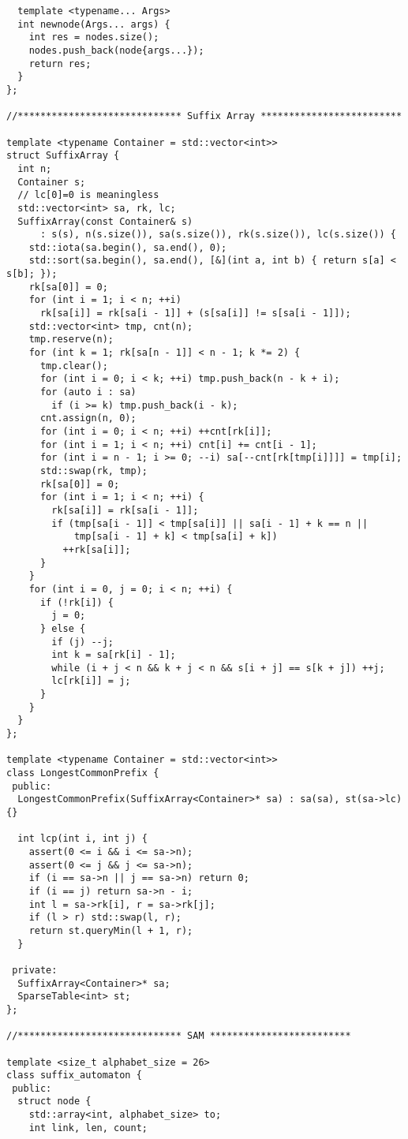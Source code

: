 \documentclass[6pt]{article}
\begin{document}
\begin{multicols}{2}
\begin{lstlisting}
  template <typename... Args>
  int newnode(Args... args) {
    int res = nodes.size();
    nodes.push_back(node{args...});
    return res;
  }
};

//***************************** Suffix Array *************************

template <typename Container = std::vector<int>>
struct SuffixArray {
  int n;
  Container s;
  // lc[0]=0 is meaningless
  std::vector<int> sa, rk, lc;
  SuffixArray(const Container& s)
      : s(s), n(s.size()), sa(s.size()), rk(s.size()), lc(s.size()) {
    std::iota(sa.begin(), sa.end(), 0);
    std::sort(sa.begin(), sa.end(), [&](int a, int b) { return s[a] < s[b]; });
    rk[sa[0]] = 0;
    for (int i = 1; i < n; ++i)
      rk[sa[i]] = rk[sa[i - 1]] + (s[sa[i]] != s[sa[i - 1]]);
    std::vector<int> tmp, cnt(n);
    tmp.reserve(n);
    for (int k = 1; rk[sa[n - 1]] < n - 1; k *= 2) {
      tmp.clear();
      for (int i = 0; i < k; ++i) tmp.push_back(n - k + i);
      for (auto i : sa)
        if (i >= k) tmp.push_back(i - k);
      cnt.assign(n, 0);
      for (int i = 0; i < n; ++i) ++cnt[rk[i]];
      for (int i = 1; i < n; ++i) cnt[i] += cnt[i - 1];
      for (int i = n - 1; i >= 0; --i) sa[--cnt[rk[tmp[i]]]] = tmp[i];
      std::swap(rk, tmp);
      rk[sa[0]] = 0;
      for (int i = 1; i < n; ++i) {
        rk[sa[i]] = rk[sa[i - 1]];
        if (tmp[sa[i - 1]] < tmp[sa[i]] || sa[i - 1] + k == n ||
            tmp[sa[i - 1] + k] < tmp[sa[i] + k])
          ++rk[sa[i]];
      }
    }
    for (int i = 0, j = 0; i < n; ++i) {
      if (!rk[i]) {
        j = 0;
      } else {
        if (j) --j;
        int k = sa[rk[i] - 1];
        while (i + j < n && k + j < n && s[i + j] == s[k + j]) ++j;
        lc[rk[i]] = j;
      }
    }
  }
};

template <typename Container = std::vector<int>>
class LongestCommonPrefix {
 public:
  LongestCommonPrefix(SuffixArray<Container>* sa) : sa(sa), st(sa->lc) {}

  int lcp(int i, int j) {
    assert(0 <= i && i <= sa->n);
    assert(0 <= j && j <= sa->n);
    if (i == sa->n || j == sa->n) return 0;
    if (i == j) return sa->n - i;
    int l = sa->rk[i], r = sa->rk[j];
    if (l > r) std::swap(l, r);
    return st.queryMin(l + 1, r);
  }

 private:
  SuffixArray<Container>* sa;
  SparseTable<int> st;
};

//***************************** SAM *************************

template <size_t alphabet_size = 26>
class suffix_automaton {
 public:
  struct node {
    std::array<int, alphabet_size> to;
    int link, len, count;


\end{lstlisting}
\end{multicols}
\end{document}
